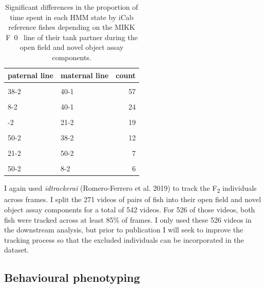 \documentclass[
]{book}
\begin{document}
\begin{table}

\caption{\label{tab:F2-cross-counts}Significant differences in the proportion of time spent in each HMM state by iCab reference fishes depending on the MIKK F~0~ line of their tank partner during the open field and novel object assay components.}
\centering
\begin{tabular}[t]{llr}
\toprule
paternal line & maternal line & count\\
\midrule
\cellcolor{gray!6}{21-2} & \cellcolor{gray!6}{40-1} & \cellcolor{gray!6}{60}\\
38-2 & 40-1 & 57\\
\cellcolor{gray!6}{38-2} & \cellcolor{gray!6}{18-2} & \cellcolor{gray!6}{35}\\
8-2 & 40-1 & 24\\
\cellcolor{gray!6}{50-2} & \cellcolor{gray!6}{18-2} & \cellcolor{gray!6}{23}\\
\addlinespace
38-2 & 21-2 & 19\\
\cellcolor{gray!6}{8-2} & \cellcolor{gray!6}{38-2} & \cellcolor{gray!6}{15}\\
50-2 & 38-2 & 12\\
\cellcolor{gray!6}{18-2} & \cellcolor{gray!6}{21-2} & \cellcolor{gray!6}{7}\\
21-2 & 50-2 & 7\\
\addlinespace
\cellcolor{gray!6}{40-1} & \cellcolor{gray!6}{50-2} & \cellcolor{gray!6}{6}\\
50-2 & 8-2 & 6\\
\bottomrule
\end{tabular}
\end{table}

I again used \emph{idtrackerai} (Romero-Ferrero et al. 2019) to track the F\textsubscript{2} individuals across frames. I split the 271 videos of pairs of fish into their open field and novel object assay components for a total of 542 videos. For 526 of those videos, both fish were tracked across at least 85\% of frames. I only used these 526 videos in the downstream analysis, but prior to publication I will seek to improve the tracking process so that the excluded individuals can be incorporated in the dataset.

\hypertarget{behavioural-phenotyping}{%
\subsection{Behavioural phenotyping}\label{behavioural-phenotyping}}
\end{document}
